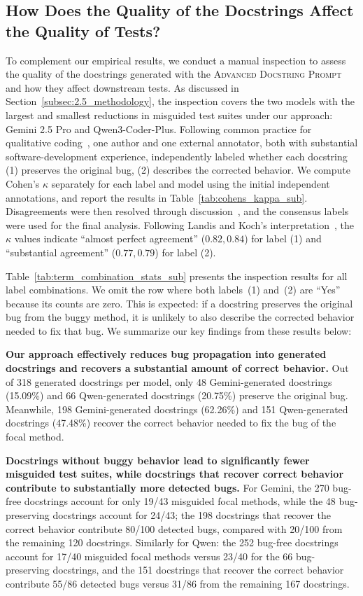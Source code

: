 \documentclass[acmsmall]{acmart}
\begin{document}
\subsection{How Does the Quality of the Docstrings Affect the Quality of Tests?}


To complement our empirical results, we conduct a manual inspection to assess the quality of the docstrings generated with the \textsc{Advanced Docstring Prompt} and how they affect downstream tests. As discussed in Section~\ref{subsec:2.5_methodology}, the inspection covers the two models with the largest and smallest reductions in misguided test suites under our approach: Gemini 2.5 Pro and Qwen3-Coder-Plus. Following common practice for qualitative coding~\cite{saldana2021coding, oconnor2020intercoder}, one author and one external annotator, both with substantial software-development experience, independently labeled whether each docstring (1) preserves the original bug, (2) describes the corrected behavior. We compute Cohen's $\kappa$ separately for each label and model using the initial independent annotations, and report the results in Table~\ref{tab:cohens_kappa_sub}. Disagreements were then resolved through discussion~\cite{chinh2019ways, huberman2014qualitative}, and the consensus labels were used for the final analysis. Following Landis and Koch's interpretation~\cite{landis1977measurement}, the $\kappa$ values indicate ``almost perfect agreement'' ($0.82, 0.84$) for label (1) and ``substantial agreement'' ($0.77, 0.79$) for label (2).

Table~\ref{tab:term_combination_stats_sub} presents the inspection results for all label combinations. We omit the row where both labels~(1) and~(2) are ``Yes'' because its counts are zero. This is expected: if a docstring preserves the original bug from the buggy method, it is unlikely to also describe the corrected behavior needed to fix that bug. We summarize our key findings from these results below:

\textbf{Our approach effectively reduces bug propagation into generated docstrings and recovers a substantial amount of correct behavior. }
Out of 318 generated docstrings per model, only 48 Gemini-generated docstrings (15.09\%) and 66 Qwen-generated docstrings (20.75\%) preserve the original bug. Meanwhile, 198 Gemini-generated docstrings (62.26\%) and 151 Qwen-generated docstrings (47.48\%) recover the correct behavior needed to fix the bug of the focal method.

\textbf{Docstrings without buggy behavior lead to significantly fewer misguided test suites, while docstrings that recover correct behavior contribute to substantially more detected bugs. }
For Gemini, the 270 bug-free docstrings account for only 19/43 misguided focal methods, while the 48 bug-preserving docstrings account for 24/43; the 198 docstrings that recover the correct behavior contribute 80/100 detected bugs, compared with 20/100 from the remaining 120 docstrings. Similarly for Qwen: the 252 bug-free docstrings account for 17/40 misguided focal methods versus 23/40 for the 66 bug-preserving docstrings, and the 151 docstrings that recover the correct behavior contribute 55/86 detected bugs versus 31/86 from the remaining 167 docstrings.
\end{document}
